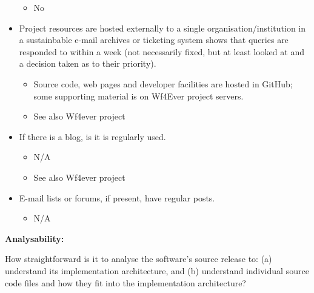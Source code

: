 \begin{itemize}
  \begin{itemize}
  \itemsep1pt\parskip0pt
  \item
    No
  \end{itemize}
\item
  Project resources are hosted externally to a single
  organisation/institution in a sustainbable e-mail archives or
  ticketing system shows that queries are responded to within a week
  (not necessarily fixed, but at least looked at and a decision taken as
  to their priority).

  \begin{itemize}
  \itemsep1pt\parskip0pt
  \item
    Source code, web pages and developer facilities are hosted in
    GitHub; some supporting material is on Wf4Ever project servers.
  \item
    See also Wf4ever project
  \end{itemize}
\item
  If there is a blog, is it is regularly used.

  \begin{itemize}
  \itemsep1pt\parskip0pt
  \item
    N/A
  \item
    See also Wf4ever project
  \end{itemize}
\item
  E-mail lists or forums, if present, have regular posts.

  \begin{itemize}
  \itemsep1pt\parskip0pt
  \item
    N/A
  \end{itemize}
\end{itemize}

\textbf{Analysability:}

How straightforward is it to analyse the software's source release to:
(a) understand its implementation architecture, and (b) understand
individual source code files and how they fit into the implementation
architecture?


